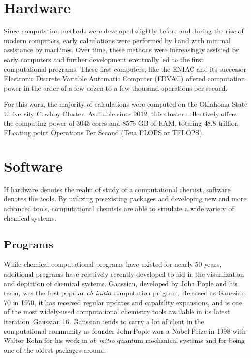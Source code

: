 \section{Hardware}

Since computation methods were developed slightly before and during the rise of modern computers, early calculations were performed by hand with minimal assistance by machines. 
Over time, these methods were increasingly assisted by early computers and further development eventually led to the first computational programs.
These first computers, like the ENIAC and its successor Electronic Discrete Variable Automatic Computer (EDVAC) offered computation power in the order of a few dozen to a few thousand operations per second.

For this work, the majority of calculations were computed on the Oklahoma State University Cowboy Cluster. 
Available since 2012, this cluster collectively offers the computing power of 3048 cores and 8576 GB of RAM, totaling 48.8 trillion FLoating point Operations Per Second (Tera FLOPS or TFLOPS). 

\section{Software}

If hardware denotes the realm of study of a computational chemist, software denotes the tools. 
By utilizing preexisting packages and developing new and more advanced tools, computational chemists are able to simulate a wide variety of chemical systems.

\subsection{Programs}

While chemical computational programs have existed for nearly 50 years, additional programs have relatively recently developed to aid in the visualization and depiction of chemical systems.
Gaussian, developed by John Pople and his team, was the first popular \textit{ab initio} computation program.
Released as Gaussian 70 in 1970, it has received regular updates and capability expansions, and is one of the most widely-used computational chemistry tools available in its latest iteration, Gaussian 16.
Gaussian tends to carry a lot of clout in the computational community as founder John Pople won a Nobel Prize in 1998 with Walter Kohn for his work in \textit{ab initio} quantum mechanical systems and for being one of the oldest packages around.

